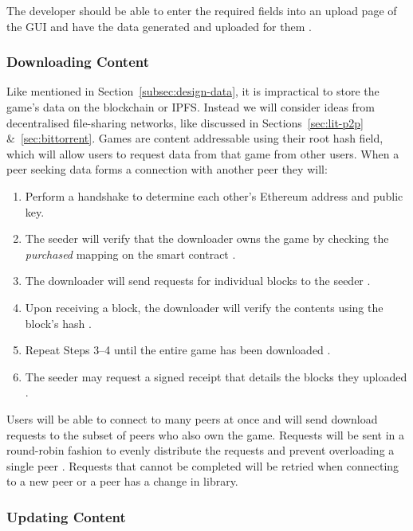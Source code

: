 \vspace{2mm}\noindent
The developer should be able to enter the required fields into an upload page of the GUI and have the data generated and uploaded for them .

\subsubsection*{Downloading Content}

Like mentioned in Section~\ref{subsec:design-data}, it is impractical to store the game's data on the blockchain or IPFS. Instead we will consider ideas from decentralised file-sharing networks, like discussed in Sections~\ref{sec:lit-p2p} \&~\ref{sec:bittorrent}.
\x
Games are content addressable using their root hash field, which will allow users to request data from that game from other users. When a peer seeking data forms a connection with another peer they will:

\begin{enumerate}
  \item Perform a handshake to determine each other's Ethereum address and public key.
  \item The seeder will verify that the downloader owns the game by checking the \textit{purchased} mapping on the smart contract  .
  \item The downloader will send requests for individual blocks to the seeder .
  \item Upon receiving a block, the downloader will verify the contents using the block's hash .
  \item Repeat Steps 3--4 until the entire game has been downloaded .
  \item The seeder may request a signed receipt that details the blocks they uploaded .
\end{enumerate}

\vspace{2mm}\noindent
Users will be able to connect to many peers at once  and will send download requests to the subset of peers who also own the game. Requests will be sent in a round-robin fashion to evenly distribute the requests and prevent overloading a single peer . Requests that cannot be completed will be retried when connecting to a new peer or a peer has a change in library.

\subsubsection*{Updating Content}\label{subsubsec:updating}

